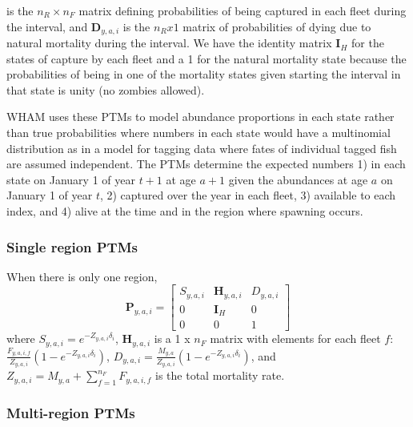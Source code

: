 \documentclass[
]{article}
\providecommand{\DIFaddtex}[1]{{\protect\color{blue}\uwave{#1}}} %
\providecommand{\DIFaddbegin}{} %
\providecommand{\DIFaddend}{} %
\providecommand{\DIFadd}[1]{\texorpdfstring{\DIFaddtex{#1}}{#1}} %
\newcommand{\DIFaddincludegraphics}[2][]{{\color{blue}\fbox{\DIFOincludegraphics[#1]{#2}}}} %
\DeclareRobustCommand{\DIFaddbegin}{\DIFOaddbegin \let\includegraphics\DIFaddincludegraphics} %
\DeclareRobustCommand{\DIFaddend}{\DIFOaddend \let\includegraphics\DIFOincludegraphics} %
\begin{document}
is the \(n_R \times n_F\) matrix defining probabilities of being captured in each fleet during the interval, and \(\mathbf{D}_{y,a,i}\) is the \(n_R x 1\) matrix of probabilities of dying due to natural mortality during the interval. We have the \DIFaddbegin \DIFadd{\(n_F\times n_F\) }\DIFaddend identity matrix \(\mathbf{I}_{H}\) for the states of capture by each fleet and a 1 for the natural mortality state because the probabilities of being in one of the mortality states given starting the interval in that state is unity (no zombies allowed).

WHAM uses these PTMs to model abundance proportions in each state rather than true probabilities where numbers in each state would have a multinomial distribution as in a model for tagging data where fates of individual tagged fish are assumed independent. The PTMs determine the expected numbers 1) in each state on January 1 of year \(t+1\) at age \(a+1\) given the abundances at age \(a\) on January 1 of year \(t\), 2) captured over the year in each fleet, 3) available to each index, and 4) alive at the time and in the region where spawning occurs.

\hypertarget{single-region-ptms}{%
\subsubsection*{Single region PTMs}\label{single-region-ptms}}

When there is only one region,
\begin{equation}\label{eq:ptm_1_region}
\mathbf{P}_{y,a,i} = 
  \begin{bmatrix}
     S_{y,a,i} & \mathbf{H}_{y,a,i} & D_{y,a,i} \\
     0 & \mathbf{I}_{H} & 0\\
     0 & 0 & 1
  \end{bmatrix}
\end{equation}
where \(S_{y,a,i} = e^{-Z_{y,a,i}\delta_i}\), \(\mathbf{H}_{y,a,i}\) is a 1 x \(n_F\) matrix with elements for each fleet \(f\): \(\frac{F_{y,a,i,f}}{Z_{y,a,i}}\left(1 - e^{-Z_{y,a,i}\delta_i}\right)\), \(D_{y,a,i} = \frac{M_{y,a}}{Z_{y,a,i}}\left(1 - e^{-Z_{y,a,i}\delta_i}\right)\), and \(Z_{y,a,i} = M_{y,a} + \sum^{n_F}_{f=1} F_{y,a,i,f}\) is the total mortality rate.

\hypertarget{multi-region-ptms}{%
\subsubsection*{Multi-region PTMs}\label{multi-region-ptms}}
\end{document}
